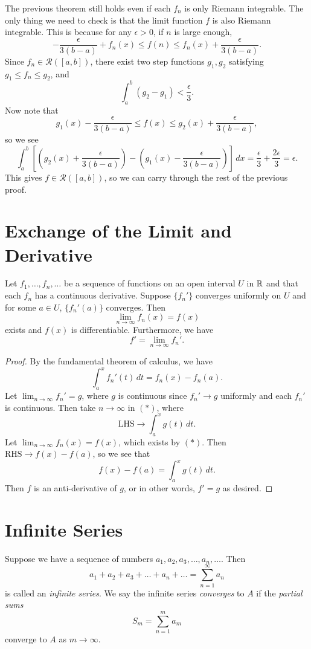 \begin{remark}
  The previous theorem still holds even if each $f_n$
  is only Riemann integrable. The only thing we need to
  check is that the limit function $f$ is
  also Riemann integrable. This is because for
  any $\epsilon > 0$, if $n$ is large enough,
  \[
    -\frac{\epsilon}{3(b - a)} + f_n(x) \le f(n) \le f_n(x) + \frac{\epsilon}{3(b - a)}.
  \]
  Since $f_n \in \mathcal{R}([a, b])$, there exist
  two step functions $g_1, g_2$ satisfying
  $g_1 \le f_n \le g_2$, and
  \[
    \int_a^b (g_2 - g_1) < \frac{\epsilon}{3}.
  \]
  Now note that
  \[
    g_1(x) - \frac{\epsilon}{3(b - a)} \le f(x) \le g_2(x) + \frac{\epsilon}{3(b - a)},
  \]
  so we see
  \[
    \int_a^b \left[\left(g_2(x) + \frac{\epsilon}{3(b - a)}\right) - \left(g_1(x) - \frac{\epsilon}{3(b - a)}\right)\right] \, dx
    = \frac{\epsilon}{3} + \frac{2\epsilon}{3} = \epsilon.
  \]
  This gives $f \in \mathcal{R}([a, b])$, so we
  can carry through the rest of the previous proof.
\end{remark}

\section{Exchange of the Limit and Derivative}
\begin{theorem}
  Let $f_1, \dots, f_n, \dots$ be a sequence of functions
  on an open interval $U$ in $\mathbb{R}$ and that each $f_n$ has
  a continuous derivative. Suppose $\{f_n'\}$ converges
  uniformly on $U$ and for some $a \in U$,
  $\{f_n'(a)\}$ converges. Then
  \[
    \lim_{n \to \infty} f_n(x) = f(x)
  \]
  exists and $f(x)$ is differentiable. Furthermore,
  we have
  \[
    f' = \lim_{n \to \infty} f_n'.
  \]
\end{theorem}

\begin{proof}
  By the fundamental theorem of calculus, we have
  \[
    \int_a^x f_n'(t)\, dt = f_n(x) - f_n(a). \tag{$*$}
  \]
  Let $\lim_{n \to \infty} f_n' = g$, where $g$ is
  continuous since $f_n' \to g$ uniformly and
  each $f_n'$ is continuous. Then take $n \to \infty$
  in $(*)$, where
  \[
    \text{LHS} \to \int_a^x g(t)\, dt.
  \]
  Let $\lim_{n \to \infty} f_n(x) = f(x)$, which
  exists by $(*)$. Then
  $\text{RHS} \to f(x) - f(a)$,
  so we see that
  \[
    f(x) - f(a) = \int_a^x g(t)\, dt.
  \]
  Then $f$ is an anti-derivative of $g$, or in other
  words, $f' = g$ as desired.
\end{proof}

\section{Infinite Series}
\begin{definition}
Suppose we have a sequence of numbers
$a_1, a_2, a_3, \dots, a_n, \dots$. Then
\[
  a_1 + a_2 + a_3 + \dots + a_n + \dots
  = \sum_{n = 1}^\infty a_n
\]
is called an \emph{infinite series}. We say the
infinite series \emph{converges} to $A$ if
the \emph{partial sums}
\[
  S_m = \sum_{n = 1}^m a_m
\]
converge to $A$ as $m \to \infty$.
\end{definition}

